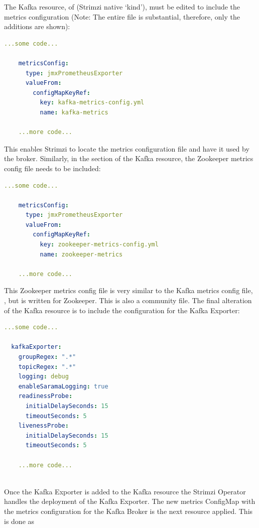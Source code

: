 The Kafka resource, of  (Strimzi native `kind'), must be edited to include the metrics configuration (Note: The entire file is
substantial, therefore, only the additions are shown):
\begin{lstlisting}[language=yaml, caption={Kafka resource with metrics configuration applied.}, label={kafka_resource_with_metrics_config.yaml}]
	...some code...

    metricsConfig:
      type: jmxPrometheusExporter
      valueFrom:
        configMapKeyRef:
          key: kafka-metrics-config.yml
          name: kafka-metrics

	...more code...
\end{lstlisting}
This enables Strimzi to locate the metrics configuration file and have it used by the broker.
Similarly, in the section of the Kafka resource, the Zookeeper metrics config file needs to be included:
\pagebreak
\begin{lstlisting}[language=yaml, caption={Zookeeper resource with metrics configuration applied.}, label={zookeeper_resource_with_metrics_config.yaml}]
	...some code...

	metricsConfig:
	  type: jmxPrometheusExporter
	  valueFrom:
		configMapKeyRef:
		  key: zookeeper-metrics-config.yml
		  name: zookeeper-metrics

	...more code...
\end{lstlisting}
This Zookeeper metrics config file is very similar to the Kafka metrics config file, , but is
written for Zookeeper. This is also a community file.
\bigbreak
The final alteration of the Kafka resource is to include the configuration for the Kafka Exporter:
\begin{lstlisting}[language=yaml, caption={Kafka resource with Kafka Exporter configuration applied.}, label={kafka_resource_with_kafka_exporter_config.yaml}]
	...some code...

  kafkaExporter:
    groupRegex: ".*"
    topicRegex: ".*"
    logging: debug
    enableSaramaLogging: true
    readinessProbe:
      initialDelaySeconds: 15
      timeoutSeconds: 5
    livenessProbe:
      initialDelaySeconds: 15
      timeoutSeconds: 5

	...more code...
	
\end{lstlisting}
Once the Kafka Exporter is added to the Kafka resource the Strimzi Operator handles the deployment of the Kafka Exporter.
\bigbreak
The new metrics ConfigMap with the metrics configuration for the Kafka Broker is the next resource applied. This is done as
